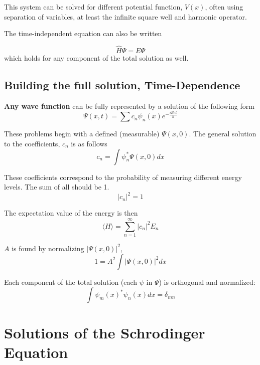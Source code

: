 This system can be solved for different potential function, $ V(x) $, often using separation of variables, at least the infinite square well and harmonic operator. 

The time-independent equation can also be written

\begin{equation}
  \hat{H}\Psi=E\Psi
\end{equation}
which holds for any component of the total solution as well.

\subsection{Building the full solution, Time-Dependence}
\textbf{Any wave function }can be fully represented by a solution of the following form
\begin{equation}
  \Psi(x,t)=\sum c_{n}\psi_{n}(x)e^{-\frac{iEnt}{\hbar}}
\end{equation}

These problems begin with a defined (measurable) $ \Psi(x,0) $. The general solution to the coefficients, $ c_{n} $ is as follows
\begin{equation}
  c_{n}=\int\psi_{n}^{*}\Psi(x,0)dx
\end{equation}

These coefficients correspond to the probability of measuring different energy levels. The sum of all should be 1. 
\begin{equation}
  |c_{n}|^2=1
\end{equation}

The expectation value of the energy is then
\begin{equation}
  \langle H\rangle = \sum_{n=1}^{\infty}|c_{n}|^2E_{n}
\end{equation}


$ A $ is found by normalizing $ |\Psi(x,0)|^2 $,
\begin{equation}
  1 = A^2\int|\Psi(x,0)|^2dx
\end{equation}


Each component of the total solution (each $ \psi  $ in $ \Psi $) is orthogonal and normalized:
\begin{equation}
  \int\psi_{m}(x)^{*}\psi_{n}(x)dx=\delta_{mn}
\end{equation}

\section{Solutions of the Schrodinger Equation}

